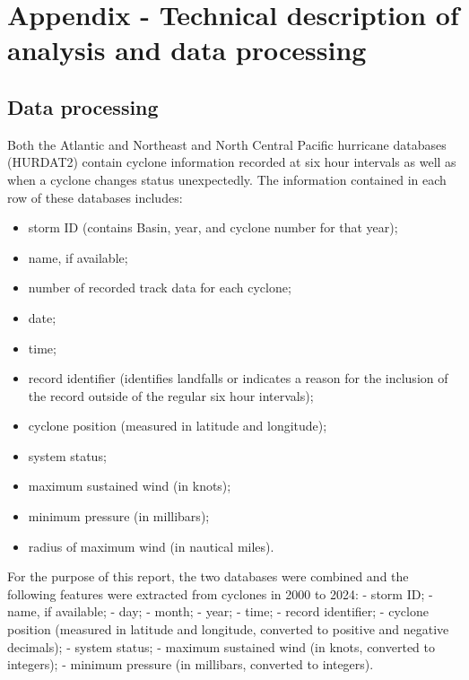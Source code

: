 \documentclass[
]{article}
\providecommand{\tightlist}{%
  \setlength{\itemsep}{0pt}\setlength{\parskip}{0pt}}
\begin{document}
\newpage

\section{Appendix - Technical description of analysis and data processing}\label{appendix---technical-description-of-analysis-and-data-processing}

\subsection{Data processing}\label{data-processing}

Both the Atlantic and Northeast and North Central Pacific hurricane databases (HURDAT2) contain cyclone information recorded at six hour intervals as well as when a cyclone changes status unexpectedly. The information contained in each row of these databases includes:

\begin{itemize}
\tightlist
\item
  storm ID (contains Basin, year, and cyclone number for that year);
\item
  name, if available;
\item
  number of recorded track data for each cyclone;
\item
  date;
\item
  time;
\item
  record identifier (identifies landfalls or indicates a reason for the inclusion of the record outside of the regular six hour intervals);
\item
  cyclone position (measured in latitude and longitude);
\item
  system status;
\item
  maximum sustained wind (in knots);
\item
  minimum pressure (in millibars);
\item
  radius of maximum wind (in nautical miles).
\end{itemize}

For the purpose of this report, the two databases were combined and the following features were extracted from cyclones in 2000 to 2024:
- storm ID;
- name, if available;
- day;
- month;
- year;
- time;
- record identifier;
- cyclone position (measured in latitude and longitude, converted to positive and negative decimals);
- system status;
- maximum sustained wind (in knots, converted to integers);
- minimum pressure (in millibars, converted to integers).
\end{document}
